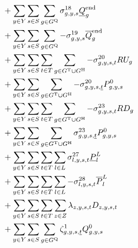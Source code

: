 \documentclass{article}
\begin{document}
\begin{align}
& + \sum\limits_{\iYear \in \sYears}\sum\limits_{\iScenario \in \sScenarios} \sum\limits_{\iGenerator \in \sStorage} \dMinStorageEnergyIntervalEnd \cStorageUnitEnergyIntervalEndMin \nonumber\\
& + \sum\limits_{\iYear \in \sYears}\sum\limits_{\iScenario \in \sScenarios} \sum\limits_{\iGenerator \in \sStorage} - \dMaxStorageEnergyIntervalEnd \cStorageUnitEnergyIntervalEndMax \nonumber\\
%
& + \sum\limits_{\iYear \in \sYears}\sum\limits_{\iScenario \in \sScenarios}\sum\limits_{\iInterval \in \sIntervals} \sum\limits_{\iGenerator \in \sGeneratorsThermal \cup \sGeneratorsHydro} - \dRampRateUp \cRampRateUp \nonumber\\
& + \sum\limits_{\iYear \in \sYears}\sum\limits_{\iScenario \in \sScenarios} \sum\limits_{\iGenerator \in \sGeneratorsThermal \cup \sGeneratorsHydro} - \dRampRateUp[\iGenerator,\iYear,\iScenario,\iIntervalStart] \cPowerInitial \nonumber\\
& + \sum\limits_{\iYear \in \sYears}\sum\limits_{\iScenario \in \sScenarios}\sum\limits_{\iInterval \in \sIntervals} \sum\limits_{\iGenerator \in \sGeneratorsThermal \cup \sGeneratorsHydro} - \dRampRateDown \cRampRateDown \nonumber\\
& + \sum\limits_{\iYear \in \sYears}\sum\limits_{\iScenario \in \sScenarios} \sum\limits_{\iGenerator \in \sGeneratorsThermal \cup \sGeneratorsHydro} \dRampRateDown[\iGenerator,\iYear,\iScenario,\iIntervalStart] \cPowerInitial \nonumber\\
& + \sum\limits_{\iYear \in \sYears}\sum\limits_{\iScenario \in \sScenarios}\sum\limits_{\iInterval \in \sIntervals} \sum\limits_{\iLink \in \sLinks} \dMinPowerFlow \cPowerFlowMin \nonumber\\
& + \sum\limits_{\iYear \in \sYears}\sum\limits_{\iScenario \in \sScenarios}\sum\limits_{\iInterval \in \sIntervals} \sum\limits_{\iLink \in \sLinks} - \dMaxPowerFlow \cPowerFlowMax \nonumber\\
& + \sum\limits_{\iYear \in \sYears}\sum\limits_{\iScenario \in \sScenarios}\sum\limits_{\iInterval \in \sIntervals} \sum\limits_{\iZone \in \sZones} \dPowerBalance \cDemand \nonumber\\
& + \sum\limits_{\iYear \in \sYears}\sum\limits_{\iScenario \in \sScenarios}\sum\limits_{\iGenerator \in \sStorage} \dStorageEnergyTransition[\iGenerator,\iYear,\iScenario,\iIntervalStart] \cStorageEnergyInitial \label{eqn: dual objective} \\ \nonumber
\end{align}
\end{document}
